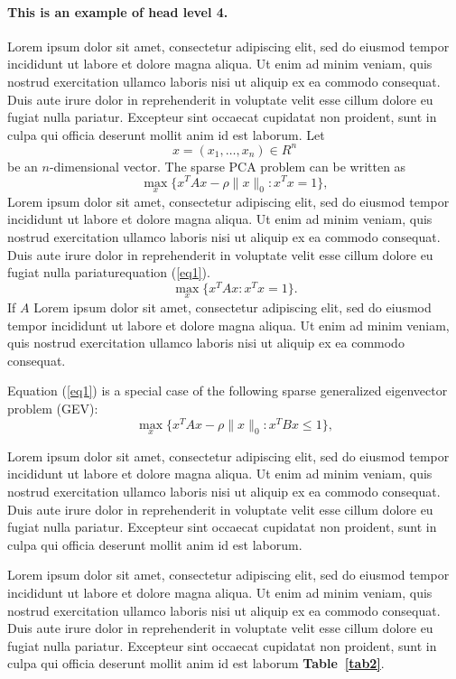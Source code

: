 \documentclass[english]{sbc2025}%
\begin{document}
\paragraph{This is an example of head level 4.}
Lorem ipsum dolor sit amet, consectetur adipiscing elit, sed do eiusmod tempor incididunt ut labore et dolore magna aliqua. Ut enim ad minim veniam, quis nostrud exercitation ullamco laboris nisi ut aliquip ex ea commodo consequat. Duis aute irure dolor in reprehenderit in voluptate velit esse cillum dolore eu fugiat nulla pariatur. Excepteur sint occaecat cupidatat non proident, sunt in culpa qui officia deserunt mollit anim id est laborum. 
Let
\[
x=(x_1,\dots,x_n)\in R^n
\]be an \(n\)-dimensional vector. The sparse PCA problem can be written as
\begin{equation}\label{eq1}
\max\limits_{x}\{x^TAx-\rho\|x\|_0:x^Tx=1\},
\end{equation}
Lorem ipsum dolor sit amet, consectetur adipiscing elit, sed do eiusmod tempor incididunt ut labore et dolore magna aliqua. Ut enim ad minim veniam, quis nostrud exercitation ullamco laboris nisi ut aliquip ex ea commodo consequat. Duis aute irure dolor in reprehenderit in voluptate velit esse cillum dolore eu fugiat nulla pariatur\break equation (\ref{eq1}). 
\[\max\limits_{x}\{x^TAx :x^Tx=1\}.\]
If $A$ Lorem ipsum dolor sit amet, consectetur adipiscing elit, sed do eiusmod tempor incididunt ut labore et dolore magna aliqua. Ut enim ad minim veniam, quis nostrud exercitation ullamco laboris nisi ut aliquip ex ea commodo consequat. 


Equation (\ref{eq1}) is a special case of the following sparse generalized eigenvector problem (GEV):
\begin{equation}\label{GEV}
\max\limits_{x}\{x^TAx-\rho \|x\|_0: x^TBx\leq 1\},
\end{equation}

Lorem ipsum dolor sit amet, consectetur adipiscing elit, sed do eiusmod tempor incididunt ut labore et dolore magna aliqua. Ut enim ad minim veniam, quis nostrud exercitation ullamco laboris nisi ut aliquip ex ea commodo consequat. Duis aute irure dolor in reprehenderit in voluptate velit esse cillum dolore eu fugiat nulla pariatur. Excepteur sint occaecat cupidatat non proident, sunt in culpa qui officia deserunt mollit anim id est laborum. 

Lorem ipsum dolor sit amet, consectetur adipiscing elit, sed do eiusmod tempor incididunt ut labore et dolore magna aliqua. Ut enim ad minim veniam, quis nostrud exercitation ullamco laboris nisi ut aliquip ex ea commodo consequat. Duis aute irure dolor in reprehenderit in voluptate velit esse cillum dolore eu fugiat nulla pariatur. Excepteur sint occaecat cupidatat non proident, sunt in culpa qui officia deserunt mollit anim id est laborum \textbf{Table~\ref{tab2}}.
\end{document}
